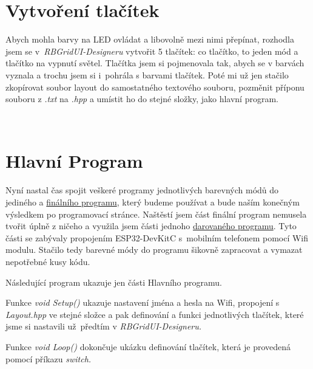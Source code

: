 
\section{Vytvoření tlačítek}
Abych mohla barvy na LED ovládat a libovolně mezi nimi přepínat, rozhodla jsem se v~{\em RBGridUI-Designeru} vytvořit 5 tlačítek: co tlačítko, to jeden mód a tlačítko na vypnutí světel. Tlačítka jsem si pojmenovala tak, abych se v barvách vyznala a trochu jsem si i~pohrála s barvami tlačítek. Poté mi už jen stačilo zkopírovat soubor layout do samostatného textového souboru, pozměnit příponu souboru z {\em .txt} na {\em .hpp} a umístit ho do stejné složky, jako hlavní program.


~
\section{Hlavní Program} 
Nyní nastal čas spojit veškeré programy jednotlivých barevných módů do jediného a  \href{https://github.com/Nemesis-Rain/Supplements-/tree/main/Final-program}{finálního programu}, který budeme používat a bude naším konečným výsledkem po programovací stránce. 
Naštěstí jsem část finální program nemusela tvořit úplně z ničeho a využila jsem části jednoho \href{https://github.com/Nemesis-Rain/Supplements-/tree/main/Original-program-layout}{darovaného programu}.
 Tyto části se zabývaly propojením ESP32-DevKitC s~mobilním telefonem pomocí Wifi modulu. Stačilo tedy barevné módy do programu šikovně zapracovat a vymazat nepotřebné kusy kódu.



Následující program ukazuje jen části Hlavního programu. 

Funkce {\em void Setup()} ukazuje nastavení jména a hesla na Wifi, propojení s {\em Layout.hpp} ve stejné složce a pak definování a funkci jednotlivých tlačítek, které jsme si nastavili už~předtím v {\em RBGridUI-Designeru.}

Funkce {\em void Loop()} dokončuje ukázku definování tlačítek, která je provedená pomocí příkazu {\em switch.}


